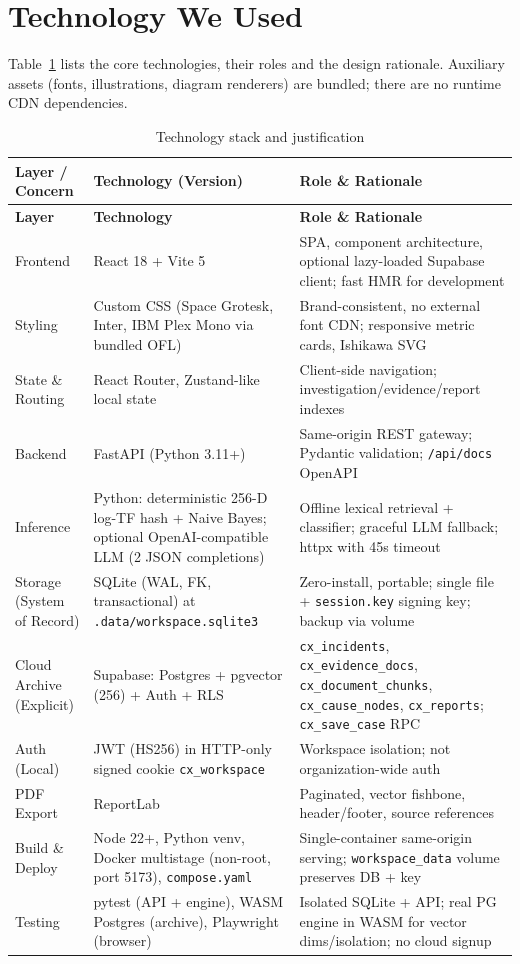 \documentclass[12pt,a4paper,oneside]{report}
\begin{document}
\section{Technology We Used}
\label{sec:tech}

Table~\ref{tab:tech} lists the core technologies, their roles and the design rationale. Auxiliary assets (fonts, illustrations, diagram renderers) are bundled; there are no runtime CDN dependencies.

\begin{longtable}{p{3.2cm} p{3.5cm} p{7.5cm}}
\caption{Technology stack and justification} \label{tab:tech}\\
\toprule
\textbf{Layer / Concern} & \textbf{Technology (Version)} & \textbf{Role \& Rationale}\\
\midrule
\endfirsthead
\toprule
\textbf{Layer} & \textbf{Technology} & \textbf{Role \& Rationale}\\
\midrule
\endhead
Frontend & React 18 + Vite 5 & SPA, component architecture, optional lazy-loaded Supabase client; fast HMR for development\\
Styling & Custom CSS (Space Grotesk, Inter, IBM Plex Mono via bundled OFL) & Brand-consistent, no external font CDN; responsive metric cards, Ishikawa SVG\\
State \& Routing & React Router, Zustand-like local state & Client-side navigation; investigation/evidence/report indexes\\
Backend & FastAPI (Python 3.11+) & Same-origin REST gateway; Pydantic validation; \texttt{/api/docs} OpenAPI\\
Inference & Python: deterministic 256-D log-TF hash + Naive Bayes; optional OpenAI-compatible LLM (2 JSON completions) & Offline lexical retrieval + classifier; graceful LLM fallback; httpx with 45s timeout\\
Storage (System of Record) & SQLite (WAL, FK, transactional) at \texttt{.data/workspace.sqlite3} & Zero-install, portable; single file + \texttt{session.key} signing key; backup via volume\\
Cloud Archive (Explicit) & Supabase: Postgres + pgvector (256) + Auth + RLS & \texttt{cx\_incidents}, \texttt{cx\_evidence\_docs}, \texttt{cx\_document\_chunks}, \texttt{cx\_cause\_nodes}, \texttt{cx\_reports}; \texttt{cx\_save\_case} RPC\\
Auth (Local) & JWT (HS256) in HTTP-only signed cookie \texttt{cx\_workspace} & Workspace isolation; not organization-wide auth\\
PDF Export & ReportLab & Paginated, vector fishbone, header/footer, source references\\
Build \& Deploy & Node 22+, Python venv, Docker multistage (non-root, port 5173), \texttt{compose.yaml} & Single-container same-origin serving; \texttt{workspace\_data} volume preserves DB + key\\
Testing & pytest (API + engine), WASM Postgres (archive), Playwright (browser) & Isolated SQLite + API; real PG engine in WASM for vector dims/isolation; no cloud signup\\
\bottomrule
\end{longtable}
\end{document}
